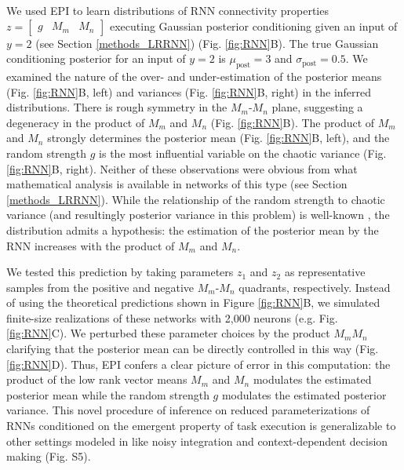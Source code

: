 \documentclass[11pt]{article}
\begin{document}
We used EPI to learn distributions of RNN connectivity properties $z = \begin{bmatrix} g & M_m & M_n \end{bmatrix}$ executing Gaussian posterior conditioning given an input of $y=2$ (see Section \ref{methods_LRRNN}) (Fig. \ref{fig:RNN}B). The true Gaussian conditioning posterior for an input of $y=2$ is $\mu_{\text{post}}=3$ and $\sigma_{\text{post}} = 0.5$.   We examined the nature of the over- and under-estimation of the posterior means (Fig. \ref{fig:RNN}B, left) and variances (Fig. \ref{fig:RNN}B, right) in the inferred distributions.  There is rough symmetry in the $M_m$-$M_n$ plane, suggesting a degeneracy in the product of $M_m$ and $M_n$ (Fig. \ref{fig:RNN}B).  
The product of $M_m$ and $M_n$ strongly determines the posterior mean (Fig. \ref{fig:RNN}B, left), and the random strength $g$ is the most influential variable on the chaotic variance (Fig. \ref{fig:RNN}B, right).
Neither of these observations were obvious from what mathematical analysis is available in networks of this type (see Section \ref{methods_LRRNN}).  While the relationship of the random strength to chaotic variance (and resultingly posterior variance in this problem) is well-known \cite{sompolinsky1988chaos}, the distribution admits a hypothesis: the estimation of the posterior mean by the RNN increases with the product of $M_m$ and $M_n$.

We tested this prediction by taking parameters $z_1$ and $z_2$ as representative samples from the positive and negative $M_m$-$M_n$ quadrants, respectively.
Instead of using the theoretical predictions shown in Figure \ref{fig:RNN}B, we simulated finite-size realizations of these networks with 2,000 neurons (e.g. Fig. \ref{fig:RNN}C).  
We perturbed these parameter choices by the product $M_m M_n$ clarifying that the posterior mean can be directly controlled in this way (Fig. \ref{fig:RNN}D).
Thus, EPI confers a clear picture of error in this computation: the product of the low rank vector means $M_m$ and $M_n$ modulates the estimated posterior mean while the random strength $g$ modulates the estimated posterior variance.
This novel procedure of inference on reduced parameterizations of RNNs conditioned on the emergent property of task execution is generalizable to other settings modeled in \cite{mastrogiuseppe2018linking} like noisy integration and context-dependent decision making (Fig. S5).
\end{document}
